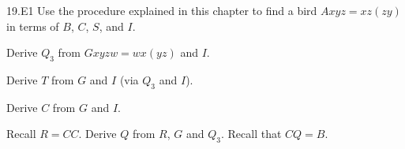 \documentclass[12pt, letterpaper]{article}
\begin{document}
\begin{prob}{19.E1} 
Use the procedure explained in this chapter to find a bird $Axyz = xz(zy)$ in terms of $B$, $C$, $S$, and $I$.
\end{prob}

\begin{prob}{20.1}  
Derive $Q_3$ from $Gxyzw = wx(yz)$ and $I$.
\end{prob}

\begin{prob}{20.2}  
Derive $T$ from $G$ and $I$ (via $Q_3$ and $I$).
\end{prob}

\begin{prob}{20.3}  
Derive $C$ from $G$ and $I$.
\end{prob}

\begin{prob}{20.4}  
Recall $R = CC$. Derive $Q$ from $R$, $G$ and $Q_3$. Recall that $CQ = B$.
\end{prob}
\end{document}
